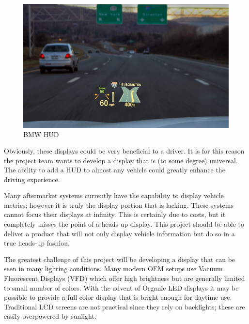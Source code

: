 \begin{figure}
	\includegraphics[width=\textwidth]{img/BMWHUD.jpg}
	\caption{BMW HUD}
	\label{fig:BMWHUD}
\end{figure}

Obviously, these displays could be very beneficial to a driver. It is for
this reason the project team wants to develop a display that is (to some
degree) universal. The ability to add a HUD to almost any vehicle could
greatly enhance the driving experience.

Many aftermarket systems currently have the capability to display vehicle
metrics; however it is truly the display portion that is lacking. These
systems cannot focus their displays at infinity. This is certainly due to
costs, but it completely misses the point of a heads-up display. This
project should be able to deliver a product that will not only display
vehicle information but do so in a true heads-up fashion.

The greatest challenge of this project will be developing a display that
can be seen in many lighting conditions. Many modern OEM setups use Vacuum
Fluorescent Displays (VFD) which offer high brightness but are generally
limited to small number of colors. With the advent of Organic LED displays
it may be possible to provide a full color display that is bright enough
for daytime use. Traditional LCD screens are not practical since they rely
on backlights; these are easily overpowered by sunlight.